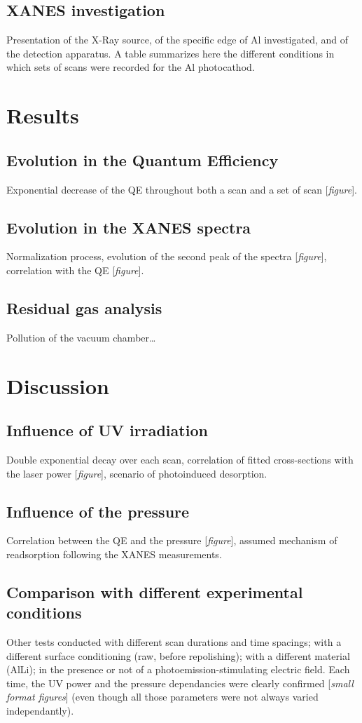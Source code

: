 \documentclass[aip,graphicx]{revtex4-1}
\begin{document}
\subsection{XANES investigation}
Presentation of the X-Ray source, of the specific edge of Al investigated, and of the detection apparatus.
A table summarizes here the different conditions in which sets of scans were recorded for the Al photocathod.

\section{Results}
\subsection{Evolution in the Quantum Efficiency}
Exponential decrease of the QE throughout both a scan and a set of scan [\textit{figure}].
\subsection{Evolution in the XANES spectra}
Normalization process, evolution of the second peak of the spectra [\textit{figure}], correlation with the QE [\textit{figure}]. 
\subsection{Residual gas analysis}
Pollution of the vacuum chamber…

\section{Discussion}

\subsection{Influence of UV irradiation}
Double exponential decay over each scan, correlation of fitted cross-sections with the laser power [\textit{figure}], scenario of photoinduced desorption.

\subsection{Influence of the pressure}
Correlation between the QE and the pressure [\textit{figure}], assumed mechanism of readsorption following the XANES measurements.

\subsection{Comparison with different experimental conditions}
Other tests conducted with different scan durations and time spacings; with a different surface conditioning (raw, before repolishing); with a different material (AlLi); in the presence or not of a photoemission-stimulating electric field. Each time, the UV power and the pressure dependancies were clearly confirmed [\textit{small format figures}] (even though all those parameters were not always varied independantly).
\end{document}
